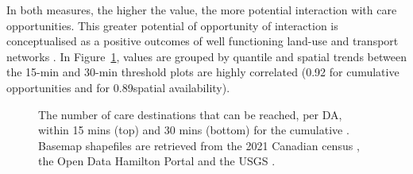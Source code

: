 \documentclass[
  authoryear,
  preprint,
  3p]{elsarticle}
\begin{document}
In both measures, the higher the value, the more potential interaction
with care opportunities. This greater potential of opportunity of
interaction is conceptualised as a positive outcomes of well functioning
land-use and transport networks
\citep{corderaImpactAccessibilityPublic2019, blumenbergDriveWorkRelationship2017, cuiSpatialAccessPublic2020}.
In Figure~\ref{fig-Fig5}, values are grouped by quantile and spatial
trends between the 15-min and 30-min threshold plots are highly
correlated (0.92 for cumulative opportunities and for 0.89spatial
availability).

\begin{figure}


\caption{\label{fig-Fig5}The number of care destinations that can be
reached, per DA, within 15 mins (top) and 30 mins (bottom) for the
cumulative . Basemap shapefiles are retrieved from the 2021 Canadian
census \citep{governmentofcanadaCensusPopulation2023}, the Open Data
Hamilton Portal \citep{opendatahamiltonCityBoundary2023} and the USGS
\citep{greatlakesUSGS2010}.}

\end{figure}%
\end{document}
